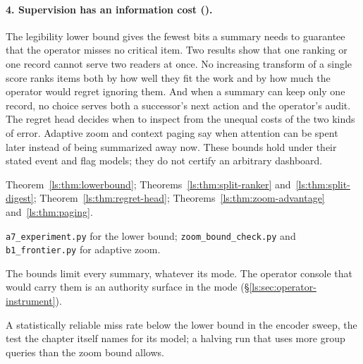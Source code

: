 \paragraph{4. Supervision has an information cost ().}
The legibility lower bound gives the fewest bits a summary needs to guarantee
that the operator misses no critical item. Two results show that one ranking or
one record cannot serve two readers at once. No increasing transform of a
single score ranks items both by how well they fit the work and by how much
the operator would regret ignoring them. And when a summary can keep only one
record, no choice serves both a successor's next action and the operator's
audit. The regret head decides when to inspect from the unequal costs of the
two kinds of error. Adaptive zoom and context paging say when attention can be
spent later instead of being summarized away now. These bounds hold under their
stated event and flag models; they do not certify an arbitrary dashboard.
\begin{description}[leftmargin=1.4em,itemsep=1pt]
  \item[Result] Theorem~\ref{ls:thm:lowerbound};
  Theorems~\ref{ls:thm:split-ranker} and~\ref{ls:thm:split-digest};
  Theorem~\ref{ls:thm:regret-head}; Theorems~\ref{ls:thm:zoom-advantage}
  and~\ref{ls:thm:paging}.
  \item[Artifact] \texttt{a7\_experiment.py} for the lower bound;
  \texttt{zoom\_bound\_check.py} and \texttt{b1\_frontier.py} for adaptive
  zoom.
  \item[Mode] The bounds limit every summary, whatever its mode. The operator
  console that would carry them is an authority surface in the
   mode (\S\ref{ls:sec:operator-instrument}).
  \item[Falsifier] A statistically reliable miss rate below the lower bound in
  the encoder sweep, the test the chapter itself names for its model; a
  halving run that uses more group queries than the zoom bound allows.
\end{description}

